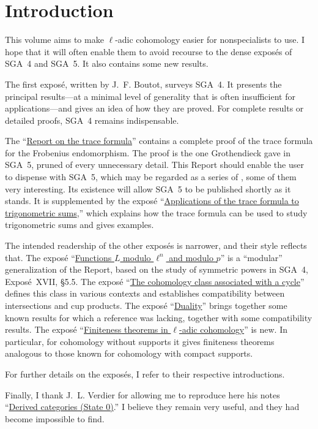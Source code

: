 

\chapter*{Introduction}

This volume aims to make $\ell$-adic cohomology easier for nonspecialists to
use. I hope that it will often enable them to avoid recourse to the dense
expos\'es of SGA~4 and SGA~5. It also contains some new results.

The first expos\'e, written by J.~F. Boutot, surveys SGA~4. It presents the
principal results---at a minimal level of generality that is often
insufficient for applications---and gives an idea of how they are proved. For
complete results or detailed proofs, SGA~4 remains indispensable.

The ``\hyperref[II]{Report on the trace formula}'' contains a complete proof of the trace formula for the
Frobenius endomorphism. The proof is the one Grothendieck gave in SGA~5,
pruned of every unnecessary detail. This Report should enable the user to
dispense with SGA~5, which may be regarded as a series of , some of
them very interesting. Its existence will allow SGA~5 to be published shortly
as it stands. It is supplemented by the expos\'e ``\hyperref[VI]{Applications of the trace formula to trigonometric sums},'' which
explains how the trace formula can be used to study trigonometric sums and
gives examples.

The intended readership of the other expos\'es is narrower, and their style
reflects that. The expos\'e ``\hyperref[III]{Functions $L$ modulo $\ell^n$ and modulo $p$}'' is a ``modular'' generalization
of the Report, based on the study of symmetric powers in SGA~4, Expos\'e~XVII,
\S5.5. The expos\'e ``\hyperref[IV]{The cohomology class associated with a cycle}'' defines this class in various contexts
and establishes compatibility between intersections and cup products. The
expos\'e ``\hyperref[V]{Duality}'' brings together some known results for which a
reference was lacking, together with some compatibility results. The expos\'e
``\hyperref[VII]{Finiteness theorems in $\ell$-adic cohomology}'' is new. In particular, for cohomology without supports it
gives finiteness theorems analogous to those known for cohomology with compact
supports.

For further details on the expos\'es, I refer to their respective
introductions.

Finally, I thank J.~L. Verdier for allowing me to reproduce here his notes
``\hyperref[VIII]{Derived categories (State 0)}.'' I believe they remain very useful, and they had become
impossible to find.

